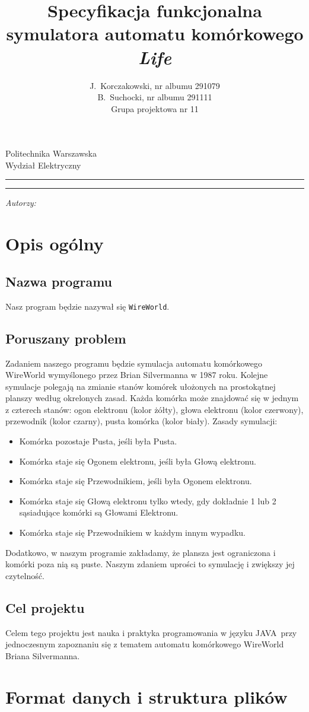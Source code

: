 \documentclass[a4paper,11pt, notitlepage ]{article}
\author{J.~Korczakowski, nr albumu 291079\\ B.~Suchocki, nr albumu 291111\\ Grupa projektowa nr 11}
\title{Specyfikacja funkcjonalna symulatora automatu komórkowego \textsl{Life}}
\makeatletter
\newcommand{\linia}{\rule{\linewidth}{0.4mm}}
\renewcommand{\maketitle}{\begin{titlepage}
    \vspace*{1cm}
    \begin{center}\small
    Politechnika Warszawska\\
    Wydział Elektryczny
    \end{center}
    \vspace{3cm}
    \noindent\linia
    \begin{center}
      \LARGE \textsc{\@title}
         \end{center}
     \linia
    \vspace{0.5cm}
    \begin{flushright}
    \begin{minipage}{8cm}
    \textit{\small Autorzy:}\\
    \normalsize \textsc{\@author} \par
    \end{minipage}
    \end{flushright}
    \vspace*{\stretch{6}}
    \begin{center}
    \@date
    \end{center}
  \end{titlepage}%
}
\makeatother
\begin{document}
\maketitle
\setcounter{page}{2}
\section{Opis ogólny}
\subsection{Nazwa programu}
Nasz program będzie nazywał się \verb+WireWorld+.
\subsection{Poruszany problem}


Zadaniem naszego programu będzie symulacja automatu komórkowego WireWorld wymyślonego przez Brian Silvermanna w 1987 roku. Kolejne symulacje polegają na zmianie stanów komórek ułożonych na prostokątnej planszy według okrelonych zasad. Każda komórka może znajdować się w jednym z czterech stanów: ogon elektronu (kolor żółty), głowa elektronu (kolor czerwony), przewodnik (kolor czarny), pusta komórka (kolor biały). Zasady symulacji:
\begin{itemize}
\item Komórka pozostaje Pusta, jeśli była Pusta.
\item Komórka staje się Ogonem elektronu, jeśli była Głową elektronu.
\item Komórka staje się Przewodnikiem, jeśli była Ogonem elektronu.
\item Komórka staje się Głową elektronu tylko wtedy, gdy dokładnie 1 lub 2 sąsiadujące komórki są Głowami Elektronu.
\item Komórka staje się Przewodnikiem w każdym innym wypadku.
\end{itemize}
\indent Dodatkowo, w naszym programie zakładamy, że plansza jest ograniczona i komórki poza nią są puste. Naszym zdaniem uprości to symulację i zwiększy jej czytelność.

\subsection{Cel projektu}
Celem tego projektu jest nauka i praktyka programowania w języku JAVA~przy jednoczesnym zapoznaniu się z tematem automatu komórkowego WireWorld Briana Silvermanna.


\section{Format danych i struktura plików}
\end{document}
